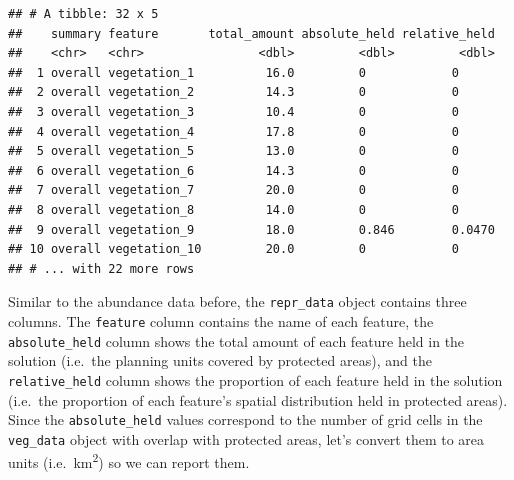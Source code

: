 \documentclass[
  12pt,
]{book}
\newenvironment{Shaded}{\begin{snugshade}}{\end{snugshade}}
\newcommand{\CommentTok}[1]{\textcolor[rgb]{0.56,0.35,0.01}{\textit{#1}}}
\newcommand{\DecValTok}[1]{\textcolor[rgb]{0.00,0.00,0.81}{#1}}
\newcommand{\FunctionTok}[1]{\textcolor[rgb]{0.00,0.00,0.00}{#1}}
\newcommand{\NormalTok}[1]{#1}
\newcommand{\OtherTok}[1]{\textcolor[rgb]{0.56,0.35,0.01}{#1}}
\newcommand{\SpecialCharTok}[1]{\textcolor[rgb]{0.00,0.00,0.00}{#1}}
\begin{document}
\begin{verbatim}
## # A tibble: 32 x 5
##    summary feature       total_amount absolute_held relative_held
##    <chr>   <chr>                <dbl>         <dbl>         <dbl>
##  1 overall vegetation_1          16.0         0            0     
##  2 overall vegetation_2          14.3         0            0     
##  3 overall vegetation_3          10.4         0            0     
##  4 overall vegetation_4          17.8         0            0     
##  5 overall vegetation_5          13.0         0            0     
##  6 overall vegetation_6          14.3         0            0     
##  7 overall vegetation_7          20.0         0            0     
##  8 overall vegetation_8          14.0         0            0     
##  9 overall vegetation_9          18.0         0.846        0.0470
## 10 overall vegetation_10         20.0         0            0     
## # ... with 22 more rows
\end{verbatim}

Similar to the abundance data before, the \texttt{repr\_data} object contains three columns. The \texttt{feature} column contains the name of each feature, the \texttt{absolute\_held} column shows the total amount of each feature held in the solution (i.e.~the planning units covered by protected areas), and the \texttt{relative\_held} column shows the proportion of each feature held in the solution (i.e.~the proportion of each feature's spatial distribution held in protected areas). Since the \texttt{absolute\_held} values correspond to the number of grid cells in the \texttt{veg\_data} object with overlap with protected areas, let's convert them to area units (i.e.~km\textsuperscript{2}) so we can report them.

\begin{Shaded}
\end{Shaded}
\end{document}

